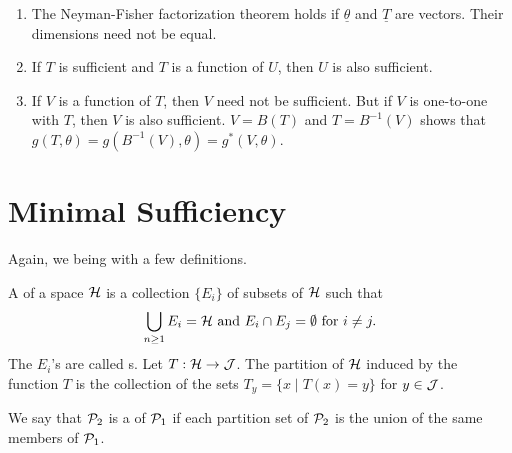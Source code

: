 \begin{remark}
    \begin{enumerate}
        \item The Neyman-Fisher factorization theorem holds if $\underline{\theta}$ and $\underline{T}$ are vectors. Their dimensions need not be equal.
        
        \item If $T$ is sufficient and $T$ is a function of $U$, then $U$ is also sufficient.
        
        \item If $V$ is a function of $T$, then $V$ need not be sufficient. But if $V$ is one-to-one with $T$, then $V$ is also sufficient. $V = B(T)$ and $T = B^{-1}(V)$ shows that $g(T,\theta) = g(B^{-1}(V),\theta) = g^{\ast}(V,\theta)$.
    \end{enumerate}
\end{remark}

\section{Minimal Sufficiency}
Again, we being with a few definitions.
\begin{definition}
    A  of a space $\mathcal{H}$ is a collection $\{E_{i}\}$ of subsets of $\mathcal{H}$ such that
    \begin{align}
        \bigcup_{n \geq 1} E_{i} = \mathcal{H} \text{ and } E_{i} \cap E_{j} = \emptyset \text{ for } i \neq j.
    \end{align}
    The $E_{i}$'s are called s. Let $T: \mathcal{H} \to \mathcal{J}$. The partition of $\mathcal{H}$ induced by the function $T$ is the collection of the sets $T_{y} = \{x \mid T(x) = y\}$ for $y \in \mathcal{J}$.
\end{definition}

We say that $\mathcal{P}_{2}$ is a  of $\mathcal{P}_{1}$ if each partition set of $\mathcal{P}_{2}$ is the union of the same members of $\mathcal{P}_{1}$.